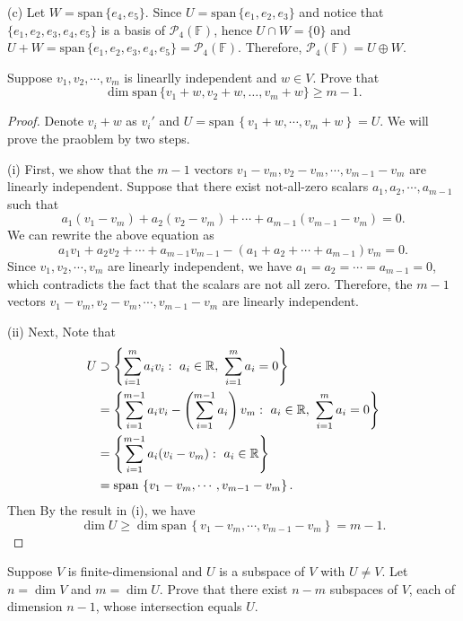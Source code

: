 \documentclass{article}
\newcommand{\sspan}{\text{span}\,}
\begin{document}
\begin{solution}
    (c) Let \( W = \sspan\{e_4, e_5\} \). Since \( U = \sspan\{e_1, e_2, e_3\} \) and notice that \( \{e_1, e_2, e_3, e_4, e_5\} \) is a basis of \( \mathcal{P}_4(\mathbb{F}) \), hence \( U \cap W = \{0\} \) and \( U + W = \sspan\{e_1, e_2, e_3, e_4, e_5\} = \mathcal{P}_4(\mathbb{F}) \). Therefore, \( \mathcal{P}_4(\mathbb{F}) = U \oplus W \).
\end{solution}

\begin{problem}[2C-8]
    Suppose $ v_1,v_2,\cdots,v_m $ is linearlly independent and $ w\in V $. Prove that
    \[ \dim\sspan \{v_1+w, v_2+w, \ldots, v_m+w\} \ge m-1. \]
\end{problem}

\begin{proof}
    Denote $ v_i+w $ as $ v_i' $ and $ U=\sspan \left\{v_1+w,\cdots,v_m+w\right\}=U $. We will prove the praoblem by two steps. \par
    (i) First, we show that the $ m-1 $ vectors $ v_1-v_m,v_2-v_m,\cdots,v_{m-1}-v_m $ are linearly independent. Suppose that there exist not-all-zero scalars $ a_1,a_2,\cdots,a_{m-1} $ such that
    \[ a_1 (v_1 - v_m) + a_2 (v_2 - v_m) + \cdots + a_{m-1} (v_{m-1} - v_m) = 0. \]
    We can rewrite the above equation as
    \[ a_1 v_1 + a_2 v_2 + \cdots + a_{m-1} v_{m-1} - (a_1 + a_2 + \cdots + a_{m-1}) v_m = 0. \]
    Since $ v_1,v_2,\cdots,v_m $ are linearly independent, we have $ a_1 = a_2 = \cdots = a_{m-1} = 0 $, which contradicts the fact that the scalars are not all zero. Therefore, the $ m-1 $ vectors $ v_1-v_m,v_2-v_m,\cdots,v_{m-1}-v_m $ are linearly independent. \par
    (ii) Next, Note that
    \begin{align*}
        U&\supset\left\{\sum_{i=1}^{m } a_iv_i:\ a_i\in\R,\ \sum_{i=1}^{m} a_i=0\right\}\\
        &=\left\{\sum_{i=1}^{m-1} a_iv_i-\left(\sum_{i=1}^{m-1} a_i \right)v_m:\ a_i\in\R,\ \sum_{i=1}^{m} a_i=0\right\}\\
        &=\left\{\sum_{i=1}^{m-1} a_i(v_i-v_m):\ a_i\in\R\right\}\\
        &=\sspan \left\{v_1-v_m,\cdots,v_{m-1}-v_m \right\}.
    \end{align*}
    Then By the result in (i), we have
    \[ \dim U\ge\dim\sspan \left\{v_1-v_m,\cdots,v_{m-1}-v_m \right\}=m-1. \] 
\end{proof}

\begin{problem}[2C-16]
    Suppose \( V \) is finite-dimensional and \( U \) is a subspace of \( V \) with \( U \neq V \). Let \( n = \dim V \) and \( m = \dim U \). Prove that there exist \( n - m \) subspaces of \( V \), each of dimension \( n - 1 \), whose intersection equals \( U \).
\end{problem}
\end{document}
